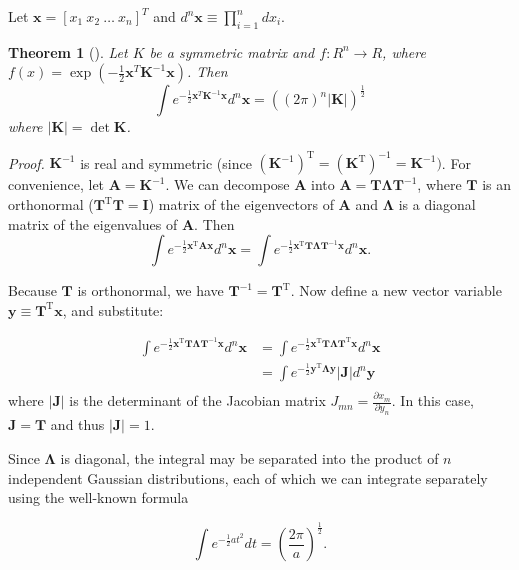 \documentclass{article}
\newcommand{\mv}[1]{\mathbf{#1}}	%
\newcommand{\mvt}[1]{\mv{#1}^{\mathrm{T}}}
\newcommand{\mvi}[1]{\mv{#1}^{-1}}
\begin{document}
Let $\mv{x} = [x_1\ x_2\ \ldots\ x_n]^T$ and $d^n \mv{x} \equiv \prod_{i=1}^{n} d x_i$.
\newtheorem{thm}{Theorem}
\begin{thm}[]
Let  $K$ be a  symmetric  matrix and
 $f: R^n \to R$, where
$f(x) = \exp{(- \frac{1}{2} \mv{x}^T \mv{K}^{-1} \mv{x})}$.
Then  
\begin{equation}
\int e^{-\frac{1}{2} \mv{x}^T \mv{K}^{-1} \mv{x}} d^n \mv{x} = \left((2\pi)^n |\mv{K}| \right)^{\frac{1}{2}}
\end{equation}
where $|\mv{K}| = \det{\mv{K}}$.
\end{thm}
\emph{Proof.} $\mvi{K}$ is real and symmetric (since $(\mvi{K})^{\mathrm{T}} = (\mvt{K})^{-1} = \mv{K}^{-1})$.  For convenience, let $\mv{A} = \mvi{K}$.  We can decompose $\mv{A}$ into $\mv{A} = \mv{T} \mv{\Lambda} \mvi{T}$, where $\mv{T}$ is an orthonormal ($\mvt{T} \mv{T} = \mv{I}$) matrix of the eigenvectors of $\mv{A}$ and $\mv{\Lambda}$ is a diagonal matrix of the eigenvalues of $\mv{A}$.  Then
\begin{equation}
\int e^{-\frac{1}{2} \mvt{x} \mv{A} \mv{x}} d^n \mv{x} = \int e^{-\frac{1}{2} \mvt{x} \mv{T} \mv{\Lambda} \mvi{T} \mv{x}} d^n \mv{x}.
\end{equation}

Because $\mv{T}$ is orthonormal, we have $\mvi{T} = \mvt{T}$.  Now define a new vector variable $\mv{y} \equiv \mvt{T} \mv{x}$, and substitute:

\begin{align}
\int e^{-\frac{1}{2} \mvt{x} \mv{T} \mv{\Lambda} \mvi{T} \mv{x}} d^n \mv{x}
&= \int e^{-\frac{1}{2} \mvt{x} \mv{T} \mv{\Lambda} \mvt{T} \mv{x}} d^n \mv{x}\\
&= \int e^{-\frac{1}{2} \mvt{y} \mv{\Lambda}\mv{y}} |\mv{J}| d^n \mv{y}\\
\end{align}
where $|\mv{J}|$ is the determinant of the Jacobian matrix $J_{mn} = \frac{\partial{x_m}}{\partial{y_n}}$.  In this case, $\mv{J} = \mv{T}$ and thus $|\mv{J}| = 1$.

Since  $\mv{\Lambda}$ is diagonal,  the integral may be separated into the product of $n$ independent Gaussian distributions, each of which we can integrate separately using the well-known formula

\begin{equation}
\int e^{-\frac{1}{2} a t^2} dt = \left(\frac{2 \pi}{a}\right)^{\frac{1}{2}}.
\end{equation}
\end{document}
